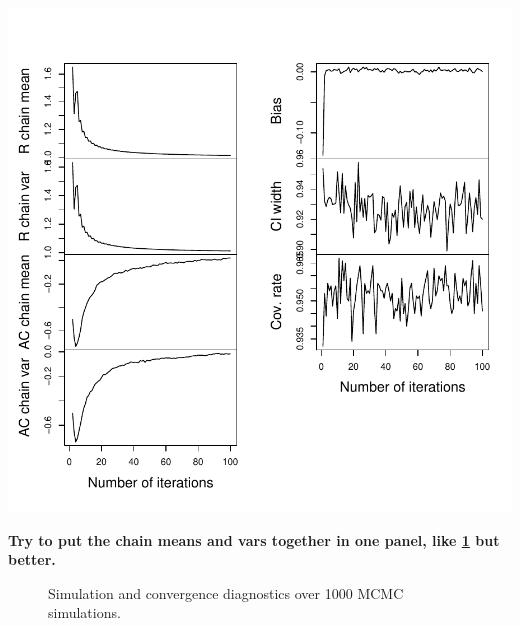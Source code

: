 \documentclass[article]{jss}
\begin{document}
\includegraphics{NoteConvergence-003}

\textbf{Try to put the chain means and vars together in one panel, like \ref{fig:rhat} but better.}


\begin{figure}[h]
  \caption{Simulation and convergence diagnostics over 1000 MCMC simulations.}
    \label{fig:rhat}
\end{figure}
\end{document}
